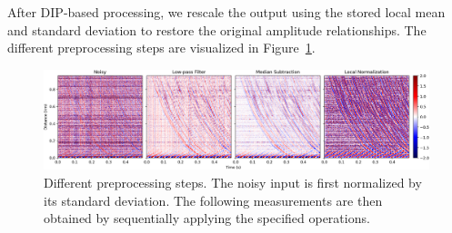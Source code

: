After DIP-based processing, we rescale the output using the stored local mean and standard deviation to restore the original amplitude relationships.
The different preprocessing steps are visualized in Figure~\ref{fig:preprocessing}.

\begin{figure}
    \centering
    \includegraphics[width=\textwidth]{img/fig_5.3.png}
    \caption{
        Different preprocessing steps.
        The noisy input is first normalized by its standard deviation.
        The following measurements are then obtained by sequentially applying the specified operations.
    }\label{fig:preprocessing}
\end{figure}
